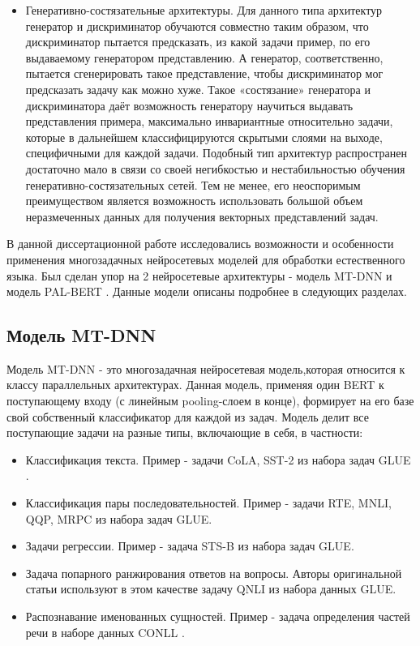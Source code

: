 \begin{itemize}
\item Генеративно-состязательные архитектуры. Для данного типа архитектур генератор и дискриминатор обучаются совместно таким образом, что дискриминатор пытается предсказать, из какой задачи пример, по его выдаваемому генератором представлению. А генератор, соответственно, пытается сгенерировать такое представление, чтобы дискриминатор мог предсказать задачу как можно хуже. Такое «состязание» генератора и дискриминатора даёт возможность генератору научиться выдавать представления примера, максимально инвариантные относительно задачи, которые в дальнейшем классифицируются скрытыми слоями на выходе, специфичными для каждой задачи. Подобный тип архитектур распространен достаточно мало в связи со своей негибкостью и нестабильностью обучения генеративно-состязательных сетей. Тем не менее, его неоспоримым преимуществом является возможность использовать большой объем неразмеченных данных для получения векторных представлений задач. 
\end{itemize}

В данной диссертационной работе исследовались возможности и особенности применения многозадачных нейросетевых моделей для обработки естественного языка. Был сделан упор на 2 нейросетевые архитектуры - модель MT-DNN \cite{mtdnn} и модель PAL-BERT \cite{stickland_2019}. Данные модели описаны подробнее в следующих разделах.

\subsection{Модель MT-DNN}\label{ch:mtl:mtdnn}
Модель MT-DNN - это многозадачная нейросетевая модель,которая относится к классу параллельных архитектурах. Данная модель, применяя один BERT к поступающему входу (с линейным pooling-слоем в конце), формирует на его базе свой собственный классификатор для каждой из задач. Модель делит все поступающие задачи на разные типы, включающие в себя, в частности:
\begin{itemize}
\item Классификация текста. Пример - задачи CoLA, SST-2 из набора задач GLUE \cite{wang_2018}.
\item Классификация пары последовательностей. Пример - задачи RTE, MNLI, QQP, MRPC из набора задач GLUE. 
\item Задачи регрессии. Пример - задача STS-B из набора задач GLUE. 
\item Задача попарного ранжирования ответов на вопросы. Авторы оригинальной статьи используют в этом качестве задачу QNLI из набора данных GLUE.
\item Распознавание именованных сущностей. Пример - задача определения частей речи в наборе данных CONLL \cite{sang_2003}. 
\end{itemize}

